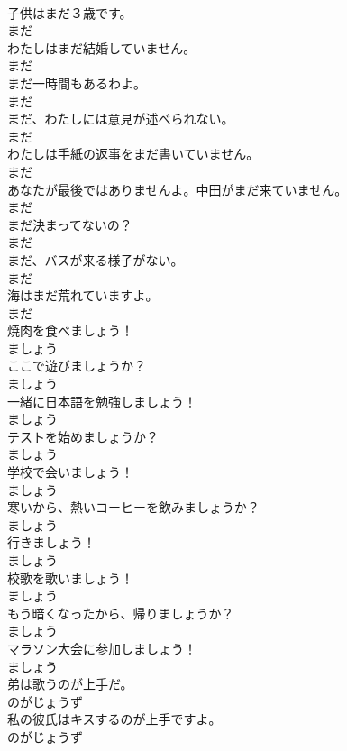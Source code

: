 \documentclass[8pt]{extreport}
\begin{document}
\begin{CJK}{UTF8}{min}
\\	子供はまだ３歳です。	
\\	まだ	
\\	わたしはまだ結婚していません。	
\\	まだ	
\\	まだ一時間もあるわよ。	
\\	まだ	
\\	まだ、わたしには意見が述べられない。	
\\	まだ	
\\	わたしは手紙の返事をまだ書いていません。	
\\	まだ	
\\	あなたが最後ではありませんよ。中田がまだ来ていません。	
\\	まだ	
\\	まだ決まってないの？	
\\	まだ	
\\	まだ、バスが来る様子がない。	
\\	まだ	
\\	海はまだ荒れていますよ。	
\\	まだ	
\\	焼肉を食べましょう！	
\\	ましょう	
\\	ここで遊びましょうか？	
\\	ましょう	
\\	一緒に日本語を勉強しましょう！	
\\	ましょう	
\\	テストを始めましょうか？	
\\	ましょう	
\\	学校で会いましょう！	
\\	ましょう	
\\	寒いから、熱いコーヒーを飲みましょうか？	
\\	ましょう	
\\	行きましょう！	
\\	ましょう	
\\	校歌を歌いましょう！	
\\	ましょう	
\\	もう暗くなったから、帰りましょうか？	
\\	ましょう	
\\	マラソン大会に参加しましょう！	
\\	ましょう	
\\	弟は歌うのが上手だ。	
\\	のがじょうず	
\\	私の彼氏はキスするのが上手ですよ。	
\\	のがじょうず	

\end{CJK}
\end{document}
